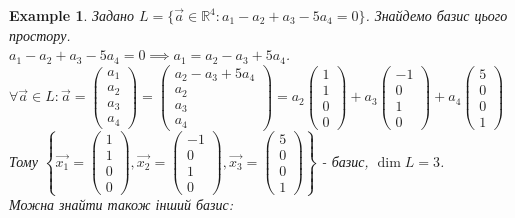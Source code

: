 \documentclass[a4paper, 10pt]{article}
\theoremstyle{theoremdd}
\newtheorem{example}[theorem]{Example}
\begin{document}
	\begin{example}
	Задано $L = \{\vec{a} \in \mathbb{R}^4: a_1 - a_2 + a_3 - 5a_4 = 0\}$. Знайдемо базис цього простору.\\
	$a_1 - a_2 + a_3 - 5a_4 = 0 \implies a_1 = a_2 - a_3 + 5a_4$.\\
	$\forall \vec{a} \in L: \vec{a} = \begin{pmatrix} a_1 \\ a_2 \\ a_3 \\ a_4 \end{pmatrix} = \begin{pmatrix} a_2 - a_3 + 5a_4 \\ a_2 \\ a_3 \\ a_4 \end{pmatrix} = a_2 \begin{pmatrix} 1 \\ 1 \\ 0 \\ 0\end{pmatrix} + a_3 \begin{pmatrix} -1 \\ 0 \\ 1 \\ 0\end{pmatrix} + a_4 \begin{pmatrix} 5 \\ 0 \\ 0 \\ 1 \end{pmatrix}$\\
	Тому $\left\{\vec{x_1} = \begin{pmatrix} 1 \\ 1 \\ 0 \\ 0\end{pmatrix}, \vec{x_2} = \begin{pmatrix} -1 \\ 0 \\ 1 \\ 0\end{pmatrix}, \vec{x_3} = \begin{pmatrix} 5 \\ 0 \\ 0 \\ 1\end{pmatrix} \right\}$ - базис, $\dim{L} = 3$.
	\bigskip \\
	Можна знайти також інший базис:\\

\end{example}
\end{document}
